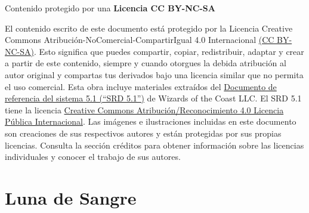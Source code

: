 \documentclass[10pt,twoside,twocolumn,openany]{dndbook}
\begin{document}
\begin{center}
  \vspace*{\fill} %
  \begin{minipage}[b]{\textwidth}
      \justifying %
      \noindent %
      \faCreativeCommons \faCreativeCommonsBy \faCreativeCommonsNc \faCreativeCommonsSa \hspace{0.5em} 
      Contenido protegido por una \textbf{Licencia CC BY-NC-SA}
      \vspace{1em} %

      {\footnotesize
      \noindent
      El contenido escrito de este documento está protegido por la Licencia Creative Commons 
      Atribución-NoComercial-CompartirIgual 4.0 Internacional 
      \href{https://creativecommons.org/licenses/by-nc-sa/4.0/deed.es}{(CC BY-NC-SA)}. Esto 
      significa que puedes compartir, copiar, redistribuir, adaptar y crear a partir de este 
      contenido, siempre y cuando otorgues la debida atribución al autor original y compartas tus 
      derivados bajo una licencia similar que no permita el uso comercial. Esta obra incluye 
      materiales extraídos del 
      \href{https://dnd.wizards.com/es/resources/systems-reference-document}{Documento de 
      referencia del sistema 5.1 (“SRD 5.1”)} de Wizards of the Coast LLC. El SRD 5.1 tiene la 
      licencia \href{https://creativecommons.org/licenses/by/4.0/legalcode.es}
      {Creative Commons Atribución/Reconocimiento 4.0 Licencia Pública Internacional}. 
      Las imágenes e ilustraciones incluidas en este documento son creaciones de sus respectivos 
      autores y están protegidas por sus propias licencias. Consulta la sección créditos para 
      obtener información sobre las licencias individuales y conocer el trabajo de sus autores.      
      }
    \end{minipage}
\end{center}

\frontmatter

\maketitle

\tableofcontents

\mainmatter

\part*{Luna de Sangre}
\end{document}
